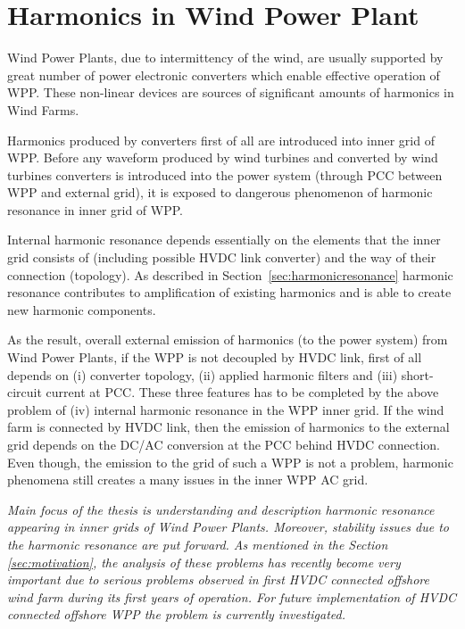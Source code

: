 \documentclass[12pt]{report} %
\begin{document}
\chapter{Harmonics in Wind Power Plant} \label{sec:harmonicsinwpp}
Wind Power Plants, due to intermittency of the wind, are usually supported by great number of power electronic converters which enable effective operation of WPP. These non-linear devices are sources of significant amounts of harmonics in Wind Farms. 

Harmonics produced by converters first of all are introduced into inner grid of WPP. Before any waveform produced by wind turbines and converted by wind turbines converters is introduced into the power system (through PCC between WPP and external grid), it is exposed to dangerous phenomenon of harmonic resonance in inner grid of WPP. 

Internal harmonic resonance depends essentially on the elements that the inner grid consists of (including possible HVDC link converter) and the way of their connection (topology). As described in Section~\ref{sec:harmonicresonance} harmonic resonance contributes to amplification of existing harmonics and is able to create new harmonic components.

As the result, overall external emission of harmonics (to the power system) from Wind Power Plants, if the WPP is not decoupled by HVDC link, first of all depends on \cite{das} (i) converter topology, (ii) applied harmonic filters and (iii) short-circuit current at PCC. These three features has to be completed by the above problem of (iv) internal harmonic resonance in the WPP inner grid. If the wind farm is connected by HVDC link, then the emission of harmonics to the external grid depends on the DC/AC conversion at the PCC behind HVDC connection. Even though, the emission to the grid of such a WPP is not a problem, harmonic phenomena still creates a many issues in the inner WPP AC grid.

\textit{Main focus of the thesis is understanding and description harmonic resonance appearing in inner grids of Wind Power Plants. Moreover, stability issues due to the harmonic resonance are put forward. As mentioned in the Section \ref{sec:motivation}, the analysis of these problems has recently become very important due to serious problems observed in first HVDC connected offshore wind farm during its first years of operation. For future implementation of HVDC connected offshore WPP the problem is currently investigated.}
\end{document}
